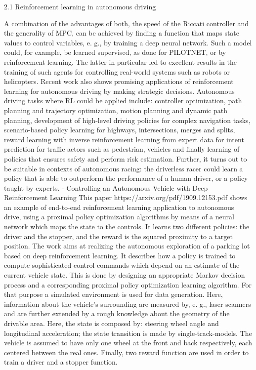 2.1 Reinforcement learning in autonomous driving


A combination of the advantages of both, the speed of the Riccati controller and the generality of MPC, can be achieved by finding a function that maps state values to
control variables, e. g., by training a deep neural network. Such a model could, for example, be learned supervised, as done for PILOTNET, or by reinforcement learning. The latter in particular led to excellent results in the training of such agents for controlling real-world systems such as robots or helicopters.
Recent work also shows promising applications of reinforcement learning for autonomous driving by making strategic decisions. 
Autonomous driving tasks where RL could be applied include: controller optimization, path planning and trajectory optimization, motion planning and dynamic path planning, development of high-level driving policies for complex navigation tasks, scenario-based policy learning for highways, intersections, merges and splits, reward learning with inverse reinforcement learning from expert data for intent prediction for traffic actors such as pedestrian, vehicles and finally learning of policies that ensures safety and perform risk estimation. Further, it turns out to be suitable in contexts of autonomous racing: the driverless racer could learn a policy that is able to outperform the performance of a human driver, or a policy taught by experts.
- Controlling an Autonomous Vehicle with Deep Reinforcement Learning
This paper https://arxiv.org/pdf/1909.12153.pdf shows an example of end-to-end reinforcement learning application to autonomous drive, using a proximal policy optimization algorithms by means of a neural network which maps the state to the controls. It learns two different policies: the driver and the stopper, and the reward is the squared proximity to a target position. The work aims at realizing the autonomous exploration of a parking lot based on deep reinforcement learning. It describes how a policy is trained to compute sophisticated control commands which depend on an estimate of the current vehicle state. This is done by designing an appropriate Markov decision process and a corresponding proximal policy optimization learning algorithm. For that purpose a simulated environment is used for data generation. Here, information about the vehicle's surrounding are measured by, e. g., laser scanners and are further extended by a rough knowledge about the geometry of the drivable area.
Here, the state is composed by: steering wheel angle and longitudinal acceleration; the state transition is made by single-track-models. The vehicle is assumed to have only one wheel at the front and back respectively, each centered between the real ones. Finally, two reward function are used in order to train a driver and a stopper function.


